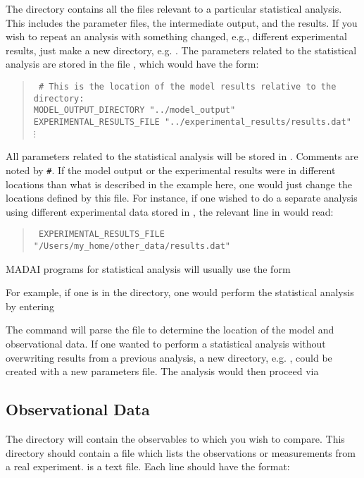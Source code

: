 The  directory contains all the files relevant to a particular statistical analysis. This includes the parameter files, the intermediate output, and the results. If you wish to repeat an analysis with something changed, e.g., different experimental results, just make a new directory, e.g. . The parameters related to the statistical analysis are stored in the file , which would have the form:
\begin{quote}{\tt
	\# This is the location of the model results relative to the  directory:\\
	MODEL\_OUTPUT\_DIRECTORY "../model\_output"\\
    EXPERIMENTAL\_RESULTS\_FILE "../experimental\_results/results.dat"\\
	$\vdots$
	}
\end{quote}
All parameters related to the statistical analysis will be stored in . Comments are noted by {\tt\#}. If the model output or the experimental results were in different locations than what is described in the example here, one would just change the locations defined by this file. For instance, if one wished to do a separate analysis using different experimental data stored in , the relevant line in  would read:

\begin{quote}{\tt
EXPERIMENTAL\_RESULTS\_FILE "/Users/my\_home/other\_data/results.dat"}
\end{quote}
MADAI programs for statistical analysis will usually use the form


For example, if one is in the  directory, one would perform the statistical analysis by entering


The command will parse the file  to determine the location of the model and observational data. If one wanted to perform a statistical analysis without overwriting results from a previous analysis, a new directory, e.g. , could be created with a new parameters file. The analysis would then proceed via


\subsection{Observational Data}
The  directory will contain the observables to which you wish to compare. This directory should contain a file  which lists the observations or measurements from a real experiment.  is a text file. Each line should have the format:

